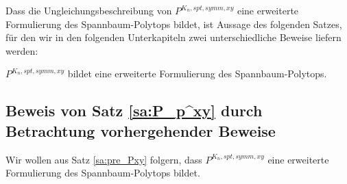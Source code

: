 \documentclass[10p,a4paper,BCOR = 12mm, DIV=15]{scrbook}
\begin{document}
Dass die Ungleichungsbeschreibung von $P^{K_n, spt, symm, xy}$ eine erweiterte Formulierung des \linebreak Spann\-baum-Polytops bildet, ist Aussage des folgenden Satzes, für den wir in den folgenden Unterkapiteln zwei unterschiedliche Beweise liefern werden:

\begin{Sa}
\label{sa:P_p^xy}
$P^{K_n, spt, symm, xy}$ bildet eine erweiterte Formulierung des Spannbaum-Polytops.
\end{Sa}

\subsection{Beweis von Satz \ref{sa:P_p^xy} durch Betrachtung vorhergehender Beweise}

Wir wollen aus Satz \ref{sa:pre_Pxy} folgern, dass $P^{K_n, spt, symm, xy}$ eine erweiterte Formulierung des Spannbaum-Polytops bildet.
\end{document}
